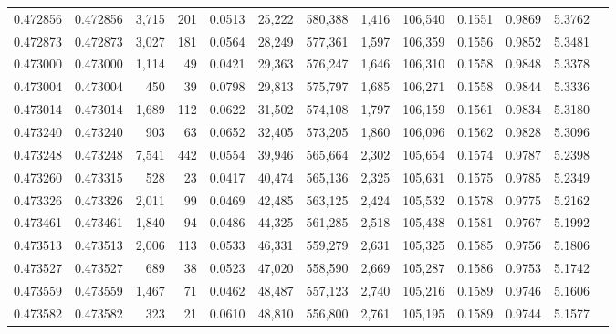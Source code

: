 \begin{tabular}{rrrrrrrrrrrrr}
0.472856 & 0.472856 & 3,715 &   201 &                                     0.0513 &  25,222 & 580,388 &   1,416 & 106,540 & 0.1551 & 0.9869 & 5.3762 \\
0.472873 & 0.472873 & 3,027 &   181 &                                     0.0564 &  28,249 & 577,361 &   1,597 & 106,359 & 0.1556 & 0.9852 & 5.3481 \\
0.473000 & 0.473000 & 1,114 &    49 &                                     0.0421 &  29,363 & 576,247 &   1,646 & 106,310 & 0.1558 & 0.9848 & 5.3378 \\
0.473004 & 0.473004 &   450 &    39 &                                     0.0798 &  29,813 & 575,797 &   1,685 & 106,271 & 0.1558 & 0.9844 & 5.3336 \\
0.473014 & 0.473014 & 1,689 &   112 &                                     0.0622 &  31,502 & 574,108 &   1,797 & 106,159 & 0.1561 & 0.9834 & 5.3180 \\
0.473240 & 0.473240 &   903 &    63 &                                     0.0652 &  32,405 & 573,205 &   1,860 & 106,096 & 0.1562 & 0.9828 & 5.3096 \\
0.473248 & 0.473248 & 7,541 &   442 &                                     0.0554 &  39,946 & 565,664 &   2,302 & 105,654 & 0.1574 & 0.9787 & 5.2398 \\
0.473260 & 0.473315 &   528 &    23 &                                     0.0417 &  40,474 & 565,136 &   2,325 & 105,631 & 0.1575 & 0.9785 & 5.2349 \\
0.473326 & 0.473326 & 2,011 &    99 &                                     0.0469 &  42,485 & 563,125 &   2,424 & 105,532 & 0.1578 & 0.9775 & 5.2162 \\
0.473461 & 0.473461 & 1,840 &    94 &                                     0.0486 &  44,325 & 561,285 &   2,518 & 105,438 & 0.1581 & 0.9767 & 5.1992 \\
0.473513 & 0.473513 & 2,006 &   113 &                                     0.0533 &  46,331 & 559,279 &   2,631 & 105,325 & 0.1585 & 0.9756 & 5.1806 \\
0.473527 & 0.473527 &   689 &    38 &                                     0.0523 &  47,020 & 558,590 &   2,669 & 105,287 & 0.1586 & 0.9753 & 5.1742 \\
0.473559 & 0.473559 & 1,467 &    71 &                                     0.0462 &  48,487 & 557,123 &   2,740 & 105,216 & 0.1589 & 0.9746 & 5.1606 \\
0.473582 & 0.473582 &   323 &    21 &                                     0.0610 &  48,810 & 556,800 &   2,761 & 105,195 & 0.1589 & 0.9744 & 5.1577 \\

\end{tabular}
